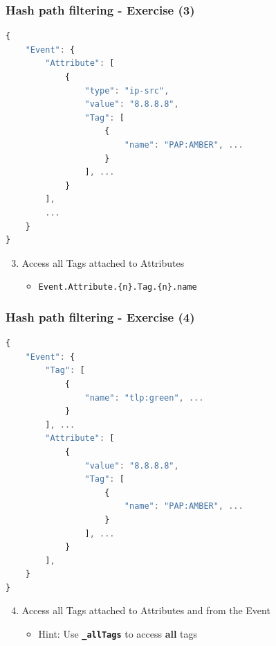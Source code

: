 \begin{frame}[fragile]
    \frametitle{Hash path filtering - Exercise (3)}

\begin{lstlisting}[language=javascript,firstnumber=1]
{
    "Event": {
        "Attribute": [
            {
                "type": "ip-src",
                "value": "8.8.8.8",
                "Tag": [
                    {
                        "name": "PAP:AMBER", ...
                    }
                ], ...
            }
        ],
        ...
    }
}
\end{lstlisting}
    \begin{enumerate}
        \setcounter{enumi}{2}
        \item Access all Tags attached to Attributes
        \pause
        \begin{itemize}
            \item \texttt{Event.Attribute.\{n\}.Tag.\{n\}.name}
        \end{itemize}
    \end{enumerate}
\end{frame}


\begin{frame}[fragile]
    \frametitle{Hash path filtering - Exercise (4)}

\begin{lstlisting}[language=javascript,firstnumber=1]
{
    "Event": {
        "Tag": [
            {
                "name": "tlp:green", ...
            }
        ], ...
        "Attribute": [
            {
                "value": "8.8.8.8",
                "Tag": [
                    {
                        "name": "PAP:AMBER", ...
                    }
                ], ...
            }
        ],
    }
}
\end{lstlisting}
    \begin{enumerate}
        \setcounter{enumi}{3}
        \item Access all Tags attached to Attributes and from the Event
        \begin{itemize}
            \item Hint: Use \texttt{\bf \_allTags} to access {\bf all} tags
        \end{itemize}
    \end{enumerate}
\end{frame}

